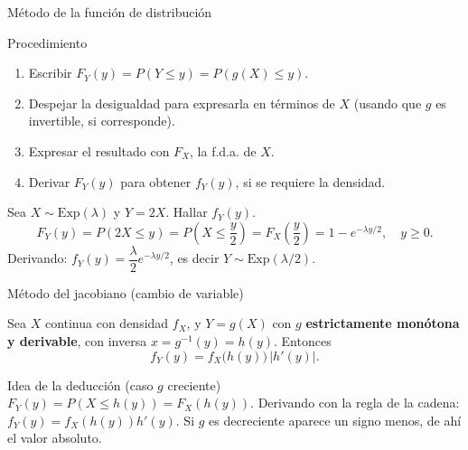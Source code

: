 \documentclass[aspectratio=169,11pt]{beamer}
\begin{document}
\begin{frame}{Método de la función de distribución}
\begin{block}{Procedimiento}
\begin{enumerate}
\item Escribir $F_Y(y) = P(Y\le y) = P(g(X)\le y)$.
\item Despejar la desigualdad para expresarla en términos de $X$ (usando que $g$ es invertible, si corresponde).
\item Expresar el resultado con $F_X$, la f.d.a. de $X$.
\item Derivar $F_Y(y)$ para obtener $f_Y(y)$, si se requiere la densidad.
\end{enumerate}
\end{block}

\begin{example}
Sea $X\sim\text{Exp}(\lambda)$ y $Y=2X$. Hallar $f_Y(y)$.
$$F_Y(y) = P(2X\le y) = P\left(X\le \frac{y}{2}\right) = F_X\left(\frac{y}{2}\right) = 1-e^{-\lambda y/2}, \quad y\ge0.$$
Derivando: $f_Y(y) = \dfrac{\lambda}{2}e^{-\lambda y/2}$, es decir $Y\sim\text{Exp}(\lambda/2)$.
\end{example}
\end{frame}

\begin{frame}{Método del jacobiano (cambio de variable)}
\begin{theorem}
Sea $X$ continua con densidad $f_X$, y $Y=g(X)$ con $g$ \textbf{estrictamente monótona y derivable}, con inversa $x=g^{-1}(y)=h(y)$. Entonces
$$f_Y(y) = f_X\big(h(y)\big)\,\left|h'(y)\right|.$$
\end{theorem}

\begin{block}{Idea de la deducción (caso $g$ creciente)}
$F_Y(y)=P(X\le h(y)) = F_X(h(y))$. Derivando con la regla de la cadena: $f_Y(y)=f_X(h(y))h'(y)$. Si $g$ es decreciente aparece un signo menos, de ahí el valor absoluto.
\end{block}
\end{frame}
\end{document}
